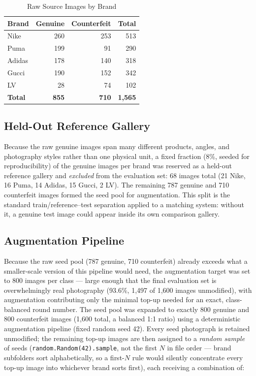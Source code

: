 \documentclass[conference]{IEEEtran}
\begin{document}
\begin{table}[t]
\caption{Raw Source Images by Brand}
\label{tab:dataset-brand}
\centering
\begin{tabular}{lrrr}
\toprule
Brand & Genuine & Counterfeit & Total \\
\midrule
Nike   & 260 & 253 & 513 \\
Puma   & 199 & 91  & 290 \\
Adidas & 178 & 140 & 318 \\
Gucci  & 190 & 152 & 342 \\
LV     & 28  & 74  & 102 \\
\midrule
\textbf{Total} & \textbf{855} & \textbf{710} & \textbf{1{,}565} \\
\bottomrule
\end{tabular}
\end{table}

\subsection{Held-Out Reference Gallery}

Because the raw genuine images span many different products, angles, and
photography styles rather than one physical unit, a fixed fraction
(8\%, seeded for reproducibility) of the genuine images per brand was
reserved as a held-out reference gallery and \emph{excluded} from the
evaluation set: 68 images total (21 Nike, 16 Puma, 14 Adidas, 15 Gucci, 2
LV). The remaining 787 genuine and 710 counterfeit images formed the seed
pool for augmentation. This split is the standard train/reference--test
separation applied to a matching system: without it, a genuine test image
could appear inside its own comparison gallery.

\subsection{Augmentation Pipeline}

Because the raw seed pool (787 genuine, 710 counterfeit) already exceeds
what a smaller-scale version of this pipeline would need, the
augmentation target was set to 800 images per class --- large enough that
the final evaluation set is overwhelmingly real photography (93.6\%,
1{,}497 of 1{,}600 images unmodified), with augmentation contributing
only the minimal top-up needed for an exact, class-balanced round number.
The seed pool was expanded to exactly 800 genuine and 800 counterfeit
images (1{,}600 total, a balanced 1:1 ratio) using a deterministic
augmentation pipeline (fixed random seed 42). Every seed photograph is
retained unmodified; the remaining top-up images are then assigned to a
\emph{random sample} of seeds (\texttt{random.Random(42).sample}, not
the first $N$ in file order --- brand subfolders sort alphabetically, so
a first-$N$ rule would silently concentrate every top-up image into
whichever brand sorts first), each receiving a combination of:
\end{document}
